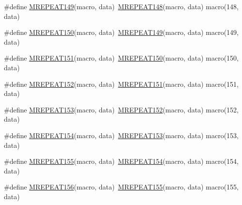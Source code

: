 \begin{DoxyCompactItemize}
\item 
\#define \mbox{\hyperlink{group__group__sam0__utils__mrepeat_ga18ca1b3d19447f3bbe8d3d10c5f238b2}{M\+R\+E\+P\+E\+A\+T149}}(macro,  data)~\mbox{\hyperlink{group__group__sam0__utils__mrepeat_gae6c61eb095a85d084a71dee42aa35eac}{M\+R\+E\+P\+E\+A\+T148}}(macro, data)   macro(148, data)
\item 
\#define \mbox{\hyperlink{group__group__sam0__utils__mrepeat_ga4b6a38c831a6d78f44cc9348c496dc5a}{M\+R\+E\+P\+E\+A\+T150}}(macro,  data)~\mbox{\hyperlink{group__group__sam0__utils__mrepeat_ga18ca1b3d19447f3bbe8d3d10c5f238b2}{M\+R\+E\+P\+E\+A\+T149}}(macro, data)   macro(149, data)
\item 
\#define \mbox{\hyperlink{group__group__sam0__utils__mrepeat_gad53956dd011ee41e4542fc564f2102f0}{M\+R\+E\+P\+E\+A\+T151}}(macro,  data)~\mbox{\hyperlink{group__group__sam0__utils__mrepeat_ga4b6a38c831a6d78f44cc9348c496dc5a}{M\+R\+E\+P\+E\+A\+T150}}(macro, data)   macro(150, data)
\item 
\#define \mbox{\hyperlink{group__group__sam0__utils__mrepeat_ga6426d25194d019d1aaeca1448aeba07d}{M\+R\+E\+P\+E\+A\+T152}}(macro,  data)~\mbox{\hyperlink{group__group__sam0__utils__mrepeat_gad53956dd011ee41e4542fc564f2102f0}{M\+R\+E\+P\+E\+A\+T151}}(macro, data)   macro(151, data)
\item 
\#define \mbox{\hyperlink{group__group__sam0__utils__mrepeat_gac8eb62a598002e65a7aee5ffce9daefb}{M\+R\+E\+P\+E\+A\+T153}}(macro,  data)~\mbox{\hyperlink{group__group__sam0__utils__mrepeat_ga6426d25194d019d1aaeca1448aeba07d}{M\+R\+E\+P\+E\+A\+T152}}(macro, data)   macro(152, data)
\item 
\#define \mbox{\hyperlink{group__group__sam0__utils__mrepeat_ga70ba0c83bec304aec635e40497033340}{M\+R\+E\+P\+E\+A\+T154}}(macro,  data)~\mbox{\hyperlink{group__group__sam0__utils__mrepeat_gac8eb62a598002e65a7aee5ffce9daefb}{M\+R\+E\+P\+E\+A\+T153}}(macro, data)   macro(153, data)
\item 
\#define \mbox{\hyperlink{group__group__sam0__utils__mrepeat_gab9b1a8f988e6f8230241c06b25c09851}{M\+R\+E\+P\+E\+A\+T155}}(macro,  data)~\mbox{\hyperlink{group__group__sam0__utils__mrepeat_ga70ba0c83bec304aec635e40497033340}{M\+R\+E\+P\+E\+A\+T154}}(macro, data)   macro(154, data)
\item 
\#define \mbox{\hyperlink{group__group__sam0__utils__mrepeat_ga4608d896f8fb7879075ba32ad5b687f9}{M\+R\+E\+P\+E\+A\+T156}}(macro,  data)~\mbox{\hyperlink{group__group__sam0__utils__mrepeat_gab9b1a8f988e6f8230241c06b25c09851}{M\+R\+E\+P\+E\+A\+T155}}(macro, data)   macro(155, data)

\end{DoxyCompactItemize}
